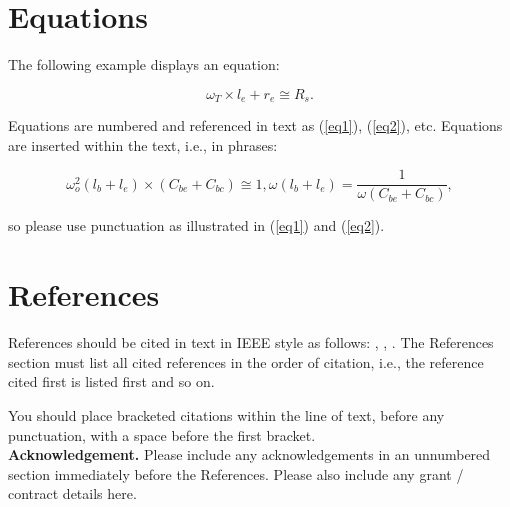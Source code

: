 \documentclass[twoside]{romjist}
\begin{document}
\section{Equations}

\hspace{0.5cm} The following example displays an equation:

\begin{equation} \label{eq1}
\omega_T \times l_e +r_e \cong R_s.
\end{equation}

Equations are numbered and referenced in text as (\ref{eq1}), (\ref{eq2}), etc. Equations are inserted within the text, i.e., in phrases:

\begin{equation} \label{eq2}
\omega_o^2(l_b+l_e) \times (C_{be}+C_{bc})\cong 1,
\omega(l_b+l_e) = \frac{1}{\omega(C_{be}+C_{bc})},
\end{equation}

\noindent so please use punctuation as illustrated in (\ref{eq1}) and (\ref{eq2}).

\section{References}

\hspace{0.5cm} References should be cited in text in IEEE style as follows: \cite{1}, \cite{2}, \cite{3--6}. The References section must list all cited references in the order of citation, i.e., the reference cited first is listed first and so on.

You should place bracketed citations within the line of text, before any punctuation, with a space before the first bracket.\\

\textbf{Acknowledgement.} Please include any acknowledgements in an unnumbered section immediately before the References. Please also include any grant / contract details here.
\end{document}
